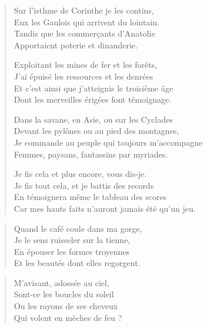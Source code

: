 \begin{verse}
  Sur l’isthme de Corinthe je les contins,\\  
  Eux les Gaulois qui arrivent du lointain.\\  
  Tandis que les commerçants d’Anatolie\\  
  Apportaient poterie et dinanderie.  

  Exploitant les mines de fer et  les forêts,\\  
  J’ai épuisé les ressources et les denrées\\  
  Et c’est ainsi que j’atteignis le troisième âge\\  
  Dont les merveilles érigées font témoignage.  

  Dans la savane, en Asie, ou sur les Cyclades\\  
  Devant les pylônes ou au pied des montagnes,\\  
  Je commande au peuple qui toujours m’accompagne\\  
  Femmes, paysans, fantassins par myriades.  

  Je fis cela et plus encore, vous dis-je.\\  
  Je fis tout cela, et je battis  des records\\  
  En témoignera même le tableau  des scores\\  
  Car mes hauts faits n’auront jamais été qu’un jeu.  
\end{verse}

\begin{verse}\quatrain
  Quand le café coule dans ma gorge,\\  %
  Je le sens ruisseler sur la tienne,\\    %
  En épouser les formes troyennes\\    %
  Et les beautés dont elles regorgent.  
\end{verse}

\begin{verse}\quatrain
  M’avisant, adossée au ciel,\\  %
  Sont-ce les boucles du soleil\\   %
  Ou les rayons de ses cheveux\\   %
  Qui volent en mèches de feu ? 
\end{verse}


